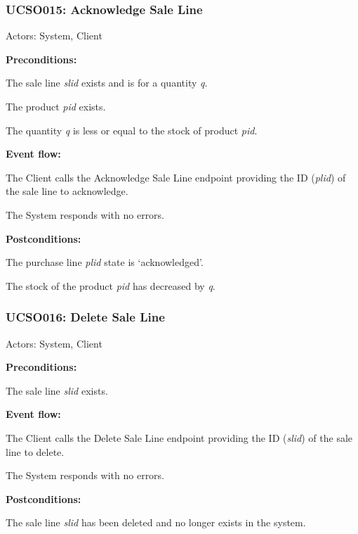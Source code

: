\begin{ucbox}{\subsubsection{UCSO015: Acknowledge Sale Line}}
\label{UCSO015}

Actors: System, Client

\textbf{Preconditions:}

\ucitem The sale line \textit{slid} exists and is for a quantity \textit{q}.

\ucitem The product \textit{pid} exists.

\ucitem The quantity \textit{q} is less or equal to the stock of product \textit{pid}.

\textbf{Event flow:}

\ucitem The Client calls the Acknowledge Sale Line endpoint providing the ID (\textit{plid}) of the sale line to acknowledge.

\ucitem The System responds with no errors.

\textbf{Postconditions:}

\ucitem The purchase line \textit{plid} state is ‘acknowledged’.

\ucitem The stock of the product \textit{pid} has decreased by \textit{q}.

\end{ucbox}

\begin{ucbox}{\subsubsection{UCSO016: Delete Sale Line}}
\label{UCSO016}

Actors: System, Client

\textbf{Preconditions:}

\ucitem The sale line \textit{slid} exists.

\textbf{Event flow:}

\ucitem The Client calls the Delete Sale Line endpoint providing the ID (\textit{slid}) of the sale line to delete.

\ucitem The System responds with no errors.

\textbf{Postconditions:}

\ucitem The sale line \textit{slid} has been deleted and no longer exists in the system.

\end{ucbox}
\newpage